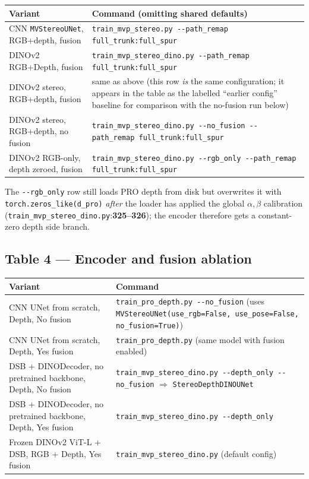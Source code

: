 \documentclass[11pt]{article}
\newcommand{\fref}[2]{\texttt{\textcolor{filegray}{#1}}:\textbf{#2}}
\begin{document}
\begin{center}\small
\begin{tabular}{p{4.7cm}p{10.3cm}}
\toprule
\textbf{Variant} & \textbf{Command (omitting shared defaults)} \\
\midrule
CNN \texttt{MVStereoUNet}, RGB+depth, fusion &
\texttt{train\_mvp\_stereo.py -{}-path\_remap full\_trunk:full\_spur} \\
DINOv2 RGB+Depth, fusion &
\texttt{train\_mvp\_stereo\_dino.py -{}-path\_remap full\_trunk:full\_spur} \\
DINOv2 stereo, RGB+depth, fusion &
same as above (this row \emph{is} the same configuration; it appears in
the table as the labelled ``earlier config'' baseline for comparison
with the no-fusion run below) \\
DINOv2 stereo, RGB+depth, no fusion &
\texttt{train\_mvp\_stereo\_dino.py -{}-no\_fusion
-{}-path\_remap full\_trunk:full\_spur} \\
DINOv2 RGB-only, depth zeroed, fusion &
\texttt{train\_mvp\_stereo\_dino.py -{}-rgb\_only
-{}-path\_remap full\_trunk:full\_spur} \\
\bottomrule
\end{tabular}
\end{center}

The \texttt{-{}-rgb\_only} row still loads PRO depth from disk but
overwrites it with \texttt{torch.zeros\_like(d\_pro)}
\emph{after} the loader has applied the global $\alpha,\beta$
calibration
(\fref{train\_mvp\_stereo\_dino.py}{325--326}); the encoder therefore
gets a constant-zero depth side branch.

\subsection{Table 4 --- Encoder and fusion ablation}

\begin{center}\small
\begin{tabular}{p{5.8cm}p{9.2cm}}
\toprule
\textbf{Variant} & \textbf{Command} \\
\midrule
CNN UNet from scratch, Depth, No fusion &
\texttt{train\_pro\_depth.py -{}-no\_fusion} (uses
\texttt{MVStereoUNet(use\_rgb=False, use\_pose=False, no\_fusion=True)}) \\
CNN UNet from scratch, Depth, Yes fusion &
\texttt{train\_pro\_depth.py} (same model with fusion enabled) \\
DSB + DINODecoder, no pretrained backbone, Depth, No fusion &
\texttt{train\_mvp\_stereo\_dino.py -{}-depth\_only -{}-no\_fusion}
$\Rightarrow$ \texttt{StereoDepthDINOUNet} \\
DSB + DINODecoder, no pretrained backbone, Depth, Yes fusion &
\texttt{train\_mvp\_stereo\_dino.py -{}-depth\_only} \\
Frozen DINOv2 ViT-L + DSB, RGB + Depth, Yes fusion &
\texttt{train\_mvp\_stereo\_dino.py} (default config) \\
\bottomrule
\end{tabular}
\end{center}
\end{document}

